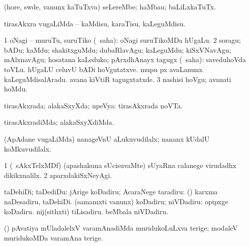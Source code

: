 \bentry
{} 
\gl{\nA}
\bmng
(hore, swde, \mo vanunx kaTuTxva) seLereMbe; haMbau; baLiLxkaTuTx. 
\emng
\eentry

\bentry
{} 
\gl{\sakirx}
\expl{}
\bmng
tirasAkxra \mo vugaLiMda -- kaMdisu, karaTisu, kaLeguMdisu. 
\emng

\noindent
\gl{\akirx}
\expl{}
\bmng
\bnum
\num{1} oNagi -- muruTu, suruTiko (\sakirx\ saha):  oNagi suruTikoMDa hUgaLu. 
\num{2} soragu; bADu; kaMdu; shakitxguMdu; dubaRlavAgu; kaLeguMdu; kiSxVNavAgu; mAlxnavAgu; hosatana kaLeduko; pArxdhAnayx tagugx (\sakirx\ saha):  saveduhoVda toVLu.  hUgaLU celuvU bADi hoVgutatxve.  mupu px avaLanunx kaLeguMdisalAradu.  avana kiVtiR tagugxtatxde. 
\num{3} nashisi hoVgu; avanati hoMdu. 
\enum
\emng
\eentry

\bentry
{} 
\gl{\gu}
\expl{}
\bmng
tirasAkxrada; alakaSxyXda; upeVya:  tirasAkxrada noVTa. 
\emng
\eentry

\bentry
{} 
\gl{\kirxvi}
\expl{}
\bmng
tirasAkxradiMda; alakaSxyXdiMda. 
\emng
\eentry

\bentry
{} 
\gl{\nA}
\emng

\noindent
\gl{\pagu}
\expl{}
\bmng
{} (ApAdane \mo vugaLiMda) nanageVnU aLukuvudilalx; nananx kUdalU koMkuvudilalx. 
\emng
\eentry

\bentry
{} 
\gl{\kirxvi}
\expl{}
\bmng
\bnum
\num{1} (\kanmu\ sAkxTelxMDf) (apashakuna sUcisuvaMte) sUyaRna calanege virudadhx dikikxnalilx. 
\num{2} aparxdakiSxNeyAgi. 
\enum
\emng
\eentry

\bentry
{} 
\gl{\sakirx}
\bmng
taDehiDi; taDediDu: 
\banum
{} jArige koDadiru; AcaraNege taradiru:  (\pArxparx) karxma naDesadiru, taDehiDi. 
 (samamxti \mo vanunx) koDadiru; niVDadiru:  opipxge koDadiru.  nij(sithxti) tiLisadiru.  beMbala niVDadiru. 
\eanum
\emng

\noindent
\gl{\pagu}
\expl{}
\bmng
{} (\ame) pAvatiya mUladalelxV varamAnadiMda muridukoLuLxva terige; modaleV muridukoMDa varamAna terige. 
\emng
\eentry

